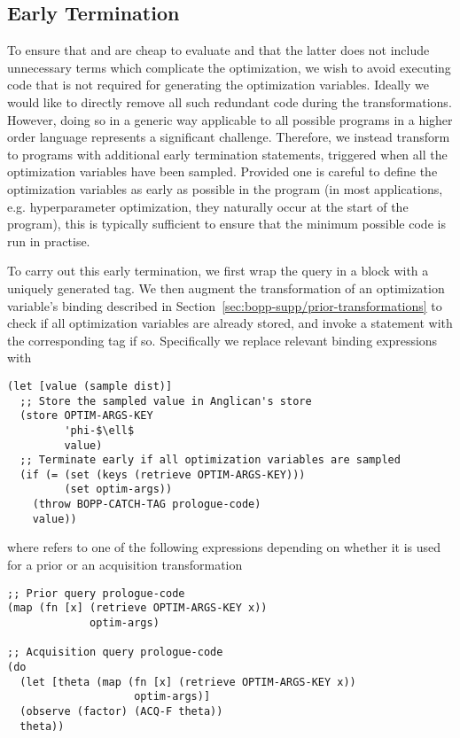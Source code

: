 \subsection{Early Termination}
\label{sec:bopp-supp/early-term}
To ensure that  and  are cheap to evaluate and that the latter does not include unnecessary terms which complicate the optimization, we wish to avoid executing code that is not required for generating the optimization variables.
Ideally we would like to directly remove all such redundant code during the transformations.
However, doing so in a generic way applicable to all possible programs in a higher order language represents a significant challenge.
Therefore, we instead transform to programs with additional early termination statements, triggered when all the optimization variables have been sampled.  
Provided one is careful to define the optimization variables as early as possible in the program (in most applications, e.g. hyperparameter optimization, they naturally occur at the start of the program), this is typically sufficient to ensure that the minimum possible code is run in practise.

To carry out this early termination, we first wrap the query in a  block with a uniquely generated tag.  We then augment the transformation of an optimization variable's binding described in Section~\ref{sec:bopp-supp/prior-transformations} to check if all optimization variables are already stored, and invoke a  statement with the corresponding tag if so.  Specifically we replace relevant binding expressions  with
    \begin{lstlisting}[basicstyle=\footnotesize\ttfamily]
(let [value (sample dist)]
  ;; Store the sampled value in Anglican's store
  (store OPTIM-ARGS-KEY
         'phi-$\ell$
         value)
  ;; Terminate early if all optimization variables are sampled
  (if (= (set (keys (retrieve OPTIM-ARGS-KEY)))
         (set optim-args))
    (throw BOPP-CATCH-TAG prologue-code)
    value))
    \end{lstlisting}
where  refers to one of the following expressions depending on whether it is used for a prior or an acquisition transformation
    \begin{lstlisting}[basicstyle=\footnotesize\ttfamily]
;; Prior query prologue-code
(map (fn [x] (retrieve OPTIM-ARGS-KEY x))
             optim-args)

;; Acquisition query prologue-code
(do
  (let [theta (map (fn [x] (retrieve OPTIM-ARGS-KEY x))
                    optim-args)]
  (observe (factor) (ACQ-F theta))
  theta))
    \end{lstlisting}

